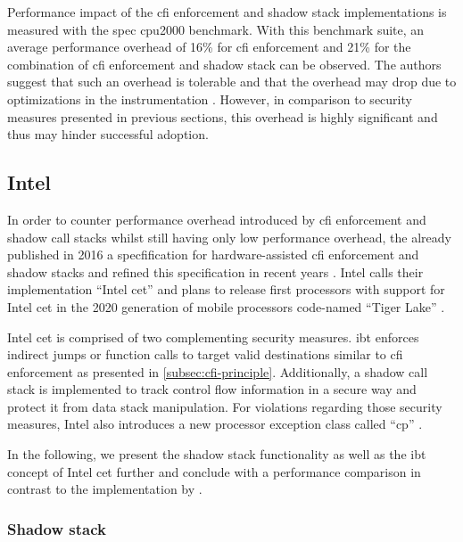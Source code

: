 Performance impact of the \gls{cfi} enforcement and shadow stack implementations is measured with the \gls{spec} \acs{cpu}2000 benchmark.
With this benchmark suite, an average performance overhead of 16\% for \gls{cfi} enforcement and 21\% for the combination of \gls{cfi} enforcement and shadow stack can be observed.
The authors suggest that such an overhead is tolerable and that the overhead may drop due to optimizations in the instrumentation \cite[346\psq,349\psq]{Abadi2005}.
However, in comparison to security measures presented in previous sections, this overhead is highly significant and thus may hinder successful adoption.

\subsection{Intel }
\label{subsec:cfi-intel-cet}

In order to counter performance overhead introduced by \gls{cfi} enforcement and shadow call stacks whilst still having only low performance overhead, the \citeauthor{IntelCorporation2019} already published in 2016 a specfification for hardware-assisted \gls{cfi} enforcement and shadow stacks and refined this specification in recent years \cite[3]{IntelCorporation2019}.
Intel calls their implementation ``Intel \gls{cet}'' and plans to release first processors with support for Intel \gls{cet} in the 2020 generation of mobile processors code-named ``Tiger Lake'' \cite{Garrison2020}.

Intel \gls{cet} is comprised of two complementing security measures.
\Gls{ibt} enforces indirect jumps or function calls to target valid destinations similar to \gls{cfi} enforcement as presented in \cref{subsec:cfi-principle}.
Additionally, a shadow call stack is implemented to track control flow information in a secure way and protect it from data stack manipulation.
For violations regarding those security measures, Intel also introduces a new processor exception class called ``\gls{cp}'' \cite[10\psqq]{IntelCorporation2019}.

In the following, we present the shadow stack functionality as well as the \gls{ibt} concept of Intel \gls{cet} further and conclude with a performance comparison in contrast to the implementation by \citeauthor{Abadi2005}.

\subsubsection{Shadow stack}
\label{subsubsec:intel-cet-shadow-stack}

